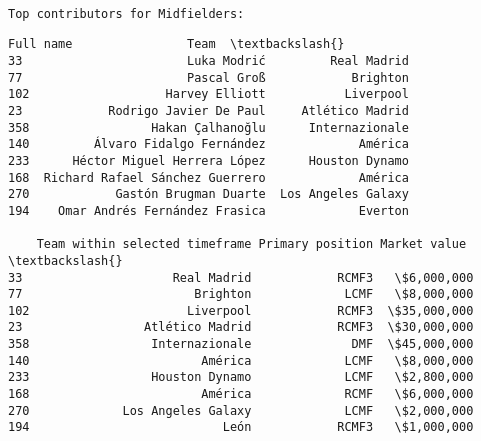 \documentclass[11pt]{article}
\makeatletter
\newcommand{\boxspacing}{\kern\kvtcb@left@rule\kern\kvtcb@boxsep}
\newcommand{\prompt}[4]{
        {\ttfamily\llap{{\color{#2}[#3]:\hspace{3pt}#4}}\vspace{-\baselineskip}}
    }
\makeatother
\begin{document}
    \begin{tcolorbox}[breakable, size=fbox, boxrule=1pt, pad at break*=1mm,colback=cellbackground, colframe=cellborder]
\prompt{In}{incolor}{48}{\boxspacing}
\begin{Verbatim}[commandchars=\\\{\}]

\end{Verbatim}
\end{tcolorbox}

    \begin{Verbatim}[commandchars=\\\{\}]

Top contributors for Midfielders:
    \end{Verbatim}

            \begin{tcolorbox}[breakable, size=fbox, boxrule=.5pt, pad at break*=1mm, opacityfill=0]
\prompt{Out}{outcolor}{48}{\boxspacing}
\begin{Verbatim}[commandchars=\\\{\}]
                           Full name                Team  \textbackslash{}
33                       Luka Modrić         Real Madrid
77                       Pascal Groß            Brighton
102                   Harvey Elliott           Liverpool
23            Rodrigo Javier De Paul     Atlético Madrid
358                 Hakan Çalhanoğlu      Internazionale
140         Álvaro Fidalgo Fernández             América
233      Héctor Miguel Herrera López      Houston Dynamo
168  Richard Rafael Sánchez Guerrero             América
270            Gastón Brugman Duarte  Los Angeles Galaxy
194    Omar Andrés Fernández Frasica             Everton

    Team within selected timeframe Primary position Market value  \textbackslash{}
33                     Real Madrid            RCMF3   \$6,000,000
77                        Brighton             LCMF   \$8,000,000
102                      Liverpool            RCMF3  \$35,000,000
23                 Atlético Madrid            RCMF3  \$30,000,000
358                 Internazionale              DMF  \$45,000,000
140                        América             LCMF   \$8,000,000
233                 Houston Dynamo             LCMF   \$2,800,000
168                        América             RCMF   \$6,000,000
270             Los Angeles Galaxy             LCMF   \$2,000,000
194                           León            RCMF3   \$1,000,000


\end{Verbatim}
\end{tcolorbox}
\end{document}
